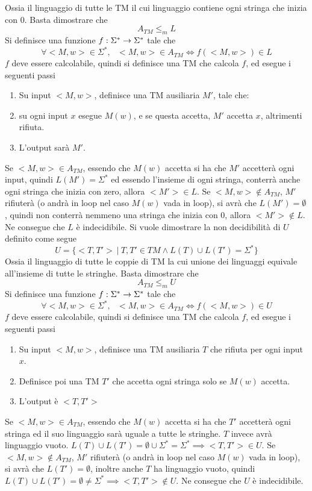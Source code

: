\documentclass[10pt, letterpaper]{report}
\begin{document}
Ossia il linguaggio di tutte le TM il cui linguaggio contiene ogni stringa che inizia con 0.
Basta dimostrare che $$ A_{TM}\le_m  L$$Si definisce una funzione ${f:\Sigma^*\rightarrow \Sigma^*}$ tale che 
$$ \forall <M,w>\in\Sigma^*, \ \ \  <M,w>\in A_{TM}\iff f( <M,w>)\in L$$
$f$ deve essere calcolabile, quindi si definisce una TM che calcola $f$, ed esegue i seguenti passi 
\begin{enumerate}
    \item  Su input $<M,w>$, definisce una TM ausiliaria $M'$, tale che:
    \item su ogni input $x$ esegue $M(w)$, e se questa accetta, $M'$ accetta $x$, altrimenti rifiuta.
    \item L'output sarà $M'$.
\end{enumerate}
\boxedMath{$\implies$} Se $<M,w>\in A_{TM}$, essendo che $M(w)$ accetta si ha che 
$M'$ accetterà ogni input, quindi $L(M')=\Sigma^*$ ed essendo l'insieme di ogni stringa, conterrà anche ogni stringa che inizia con zero, allora $<M'>\in L$.
\acc \boxedMath{$\impliedby$} Se $<M,w>\notin A_{TM}$, $M'$ rifiuterà  (o andrà in loop nel caso $M(w)$ vada in loop), si avrà che 
$L(M')=\emptyset$, quindi non conterrà nemmeno una stringa che inizia con 0, allora  $<M'>\notin L$.
Ne consegue che $L$ è indecidibile.
Si vuole dimostrare la non decidibilità di $U$ definito come segue 
$$ U=\{<T,T'> \ | \ T,T'\in TM\land L(T)\cup L(T')=\Sigma^*\}$$ 
Ossia il linguaggio di tutte le coppie di TM la cui unione dei linguaggi equivale all'insieme di tutte le stringhe.
Basta dimostrare che $$ A_{TM}\le_m  U$$Si definisce una funzione ${f:\Sigma^*\rightarrow \Sigma^*}$ tale che 
$$ \forall <M,w>\in\Sigma^*, \ \ \  <M,w>\in A_{TM}\iff f( <M,w>)\in U$$
$f$ deve essere calcolabile, quindi si definisce una TM che calcola $f$, ed esegue i seguenti passi 
\begin{enumerate}
    \item  Su input $<M,w>$, definisce una TM ausiliaria $T$ che rifiuta per ogni input $x$. 
    \item Definisce poi una TM $T'$ che accetta ogni stringa solo se $M(w)$ accetta. 
    \item L'output è $<T,T'>$
\end{enumerate}
\boxedMath{$\implies$} Se $<M,w>\in A_{TM}$, essendo che $M(w)$ accetta si ha che
$T'$ accetterà ogni stringa ed il suo linguaggio sarà uguale a tutte le stringhe. $T$ invece avrà linguaggio vuoto. $L(T)\cup L(T')=\emptyset\cup \Sigma^*=\Sigma^*\implies <T,T'>\in U$.
\acc \boxedMath{$\impliedby$} Se $<M,w>\notin A_{TM}$, $M'$ rifiuterà  (o andrà in loop nel caso $M(w)$ vada in loop), si avrà che 
$L(T')=\emptyset$, inoltre anche $T$ ha linguaggio vuoto, quindi $L(T)\cup L(T')=\emptyset\ne \Sigma^*\implies <T,T'>\notin U$. Ne consegue che $U$ è indecidibile.
\flowerLine
\end{document}
